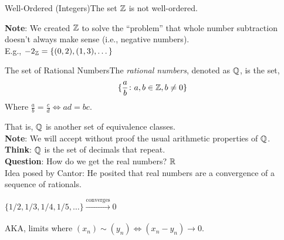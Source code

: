

            \begin{exercise}
                {Well-Ordered (Integers)}The set \(\mathbb{Z}\) is not well-ordered.
            \end{exercise}
            \noindent \textbf{Note}: We created \(\mathbb{Z}\) to solve the ``problem'' that whole number subtraction doesn't always make sense (i.e., negative numbers). \\
            E.g., \(-2_{\mathbb{Z}} = \{(0,2),(1,3),\dots\}\)
    


            \begin{definition}
                {The set of Rational Numbers}The \textit{rational numbers}, denoted as \(\mathbb{Q}\), is the set, \[\{\frac{a}{b} \colon a,b \in \mathbb{Z}, b \ne 0\}\]
                Where \(\frac{a}{b} = \frac{c}{d} \iff ad = bc\).
            \end{definition}
            \noindent That is, \(\mathbb{Q}\) is another set of equivalence classes. \\
            \textbf{Note}: We will accept without proof the usual arithmetic properties of \(\mathbb{Q}\). \\

            \textbf{Think}: \(\mathbb{Q}\) is the set of decimals that repeat. \\

            \textbf{Question}: How do we get the real numbers? \(\mathbb{R}\) \\

            Idea posed by Cantor: He posited that real numbers are a convergence of a sequence of rationals. 

            \begin{example}
                \(\{1/2,1/3,1/4,1/5,\dots\} \xrightarrow[\text{}]{\text{converges}} 0\)
            \end{example}

            AKA, limits where \((x_n) \sim (y_n) \iff (x_n - y_n) \rightarrow 0\).